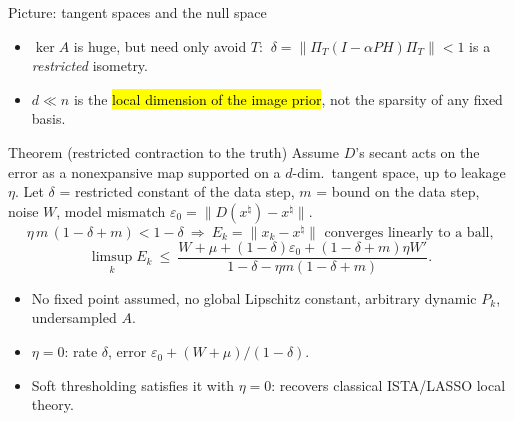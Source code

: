 \iflong
\begin{frame}{Picture: tangent spaces and the null space}
\centering
{}
\begin{itemize}
\item $\ker A$ is huge, but need only avoid $T$: $\ \delta=\|\Pi_T(I-\alpha PH)\Pi_T\|<1$ is a \emph{restricted} isometry.
\item $d\ll n$ is the \hl{local dimension of the image prior}, not the sparsity of any fixed basis.
\end{itemize}
\end{frame}
\fi

\begin{frame}{Theorem (restricted contraction to the truth)}
\small
\small
Assume $D$'s secant acts on the error as a nonexpansive map supported on a $d$-dim.\ tangent space, up to leakage $\eta$. Let $\delta$ = restricted constant of the data step, $m$ = bound on the data step, noise $W$, model mismatch $\varepsilon_0=\|D(x^\natural)-x^\natural\|$.
\[ \eta\, m\,(1-\delta+m)<1-\delta\ \Longrightarrow\ E_k=\|x_k-x^\natural\|\text{ converges linearly to a ball,} \]
\[ \limsup_k E_k\ \le\ \frac{W+\mu+(1-\delta)\varepsilon_0+(1-\delta+m)\eta W'}{1-\delta-\eta m(1-\delta+m)} . \]
\begin{itemize}
\item No fixed point assumed, no global Lipschitz constant, arbitrary dynamic $P_k$, undersampled $A$.
\item $\eta=0$: rate $\delta$, error $\varepsilon_0+(W+\mu)/(1-\delta)$.
\item Soft thresholding satisfies it with $\eta=0$: recovers classical ISTA/LASSO local theory.
\end{itemize}
\end{frame}

